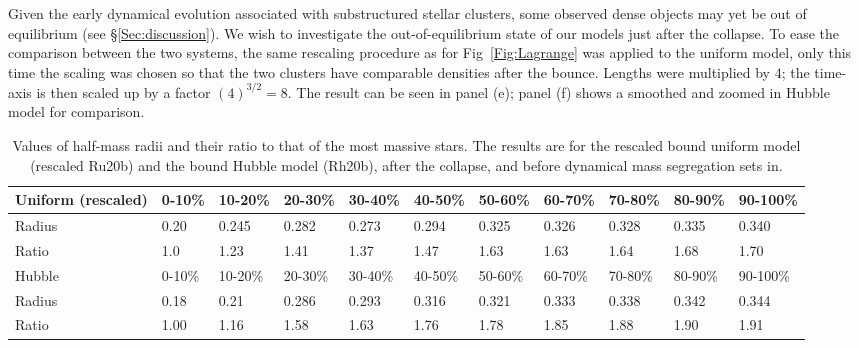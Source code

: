Given the early dynamical evolution associated with substructured stellar clusters, some observed dense objects may yet be out of equilibrium (see \S\ref{Sec:discussion}). We wish to investigate the out-of-equilibrium state of our models just after the collapse. To ease the comparison between the two systems, the same rescaling procedure as for Fig~\ref{Fig:Lagrange} was applied to the uniform model, only this time the scaling was chosen so that the two clusters have comparable densities after the bounce. Lengths were multiplied by $4$; the time-axis is then scaled up by a factor $(4)^{3/2} = 8$. The result can be seen in panel (e); panel (f) shows a smoothed and zoomed in Hubble model for comparison.



\begin{table}
\caption{Values of half-mass radii and their ratio to that of the most massive stars. The results are for the rescaled bound uniform model (rescaled Ru20b) and the bound Hubble model (Rh20b), after the collapse, and before dynamical mass segregation sets in.} \label{Tab:RhmVal}
\begin{tabular}{l|llllllllll}
Uniform (rescaled) & 0-10\% & 10-20\% & 20-30\% & 30-40\% & 40-50\% & 50-60\% & 60-70\% & 70-80\% & 80-90\% & 90-100\% \\
\hline
Radius   & 0.20 & 0.245 & 0.282 & 0.273 & 0.294 & 0.325 & 0.326 &  0.328 & 0.335 & 0.340 \\
Ratio    & 1.0 & 1.23 & 1.41 & 1.37 & 1.47  & 1.63 & 1.63 &  1.64 & 1.68 & 1.70 \\

\hline
Hubble  & 0-10\% & 10-20\% & 20-30\% & 30-40\% & 40-50\% & 50-60\% & 60-70\% & 70-80\% & 80-90\% & 90-100\% \\
\hline
Radius  &  0.18 & 0.21 & 0.286 & 0.293 & 0.316 & 0.321 & 0.333 & 0.338 & 0.342 & 0.344 \\
 Ratio       & 1.00 & 1.16 & 1.58 & 1.63 & 1.76  & 1.78  & 1.85 &  1.88 & 1.90 &  1.91 \\
\end{tabular}
\end{table}




